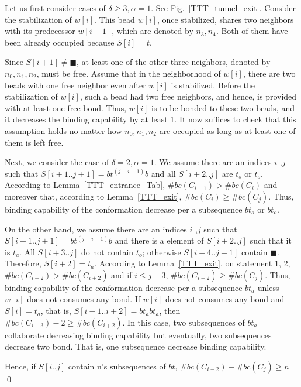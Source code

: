 

Let us first consider cases of $\delta \geq 3, \alpha = 1$. 
See Fig.~\ref{TTT_tunnel_exit}. Consider the stabilization of $w[i]$. 
This bead $w[i]$, once stabilized, shares two neighbors with its predecessor $w[i-1]$, which are denoted by $n_3, n_4$. 
Both of them have been already occupied because $S[i] = t$. 

Since $S[i+1] \neq \blacksquare$, at least one of the other three neighbors, denoted by $n_0, n_1, n_2$, must be free. 
Assume that in the neighborhood of $w[i]$, there are two beads with one free neighbor even after $w[i]$ is stabilized. 
Before the stabilization of $w[i]$, such a bead had two free neighbors, and hence, is provided with at least one free bond. 
Thus, $w[i]$ is to be bonded to these two beads, and it decreases the binding capability by at least 1. 
It now suffices to check that this assumption holds no matter how $n_0, n_1, n_2$ are occupied as long as at least one of them is left free. 

Next, we consider the case of $\delta = 2, \alpha = 1$. We assume there are an indices $i$ ,$j$ such that $S[i+1..j+1] = bt^{(j-i-1)}b$ and all $S[i+2..j]$ are  $ t_s$ or  $t_o$.
According to Lemma~\ref{TTT_entrance_Tab}, $\#bc(C_{i-1}) > \#bc(C_{i})$ and moreover that, according to Lemma~\ref{TTT_exit}, $\#bc(C_{i}) \geq \#bc(C_{j})$.
Thus, binding capability of the conformation decrease per a subsequence $bt_s$ or $bt_o$.

On the other hand, we assume there are an indices $i$ ,$j$ such that $S[i+1..j+1] = bt^{(j-i-1)}b$ and there is a element of $S[i+2..j]$ such that it is $t_a$.
All $S[i+3..j]$ do not contain $t_o$; otherwise $S[i+4..j+1]$ contain $\blacksquare$.
Therefore, $S[i+2] = t_a$.
According to Lemma~\ref{TTT_exit}, on statement 1, 2, $\#bc(C_{i-2}) > \#bc(C_{i+2})$ and if $i \leq j - 3$, $\#bc(C_{i+2}) \geq \#bc(C_{j})$.
Thus, binding capability of the conformation decrease per a subsequence $bt_a$ unless $w[i]$ does not consumes any bond.
If $w[i]$ does not consumes any bond and $S[i] = t_a$, that is, $S[i-1..i+2] = bt_abt_a$, then $\#bc(C_{i-3}) - 2 \geq \#bc(C_{i+2})$.
In this case, two subsequences of $bt_a$ collaborate decreasing binding capability but eventually, two subsequences decrease two bond.
That is, one subsequence decrease binding capability.


Hence, if $S[i..j]$ contain n's subsequences of $bt$, $\#bc(C_{i-2}) - \#bc(C_{j}) \geq n$
\qed






